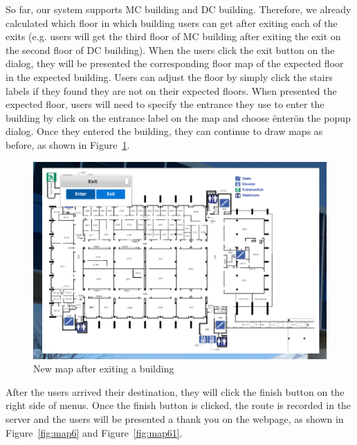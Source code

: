 \documentclass{sigchi}
\begin{document}
So far, our system supports MC building and DC building. Therefore, we already calculated which floor in which building users can get after exiting each of the exits (e.g. users will get the third floor of MC building after exiting the exit on the second floor of DC building). When the users click the exit button on the dialog, they will be presented the corresponding floor map of the expected floor in the expected building. Users can adjust the floor by simply click the stairs labels if they found they are not on their expected floors. When presented the expected floor, users will need to specify the entrance they use to enter the building by click on the entrance label on the map and choose \"enter\" on the popup dialog. Once they entered the building, they can continue to draw maps as before, as shown in Figure~\ref{fig:map5}.


\begin{figure}[!h]
\centering
\includegraphics[width=1.0\columnwidth]{pics/map5.png}
\caption{New map after exiting a building}
\label{fig:map5}
\end{figure}

After the users arrived their destination, they will click the finish button on the right side of menus. Once the finish button is clicked, the route is recorded in the server and the users will be presented a thank you on the webpage, as shown in Figure~\ref{fig:map6} and Figure~\ref{fig:map61}.
\end{document}
